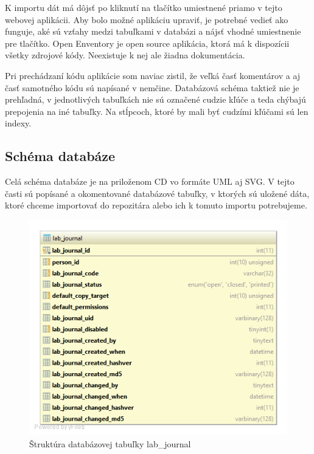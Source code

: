 \documentclass[thesis=M,slovak]{FITthesis}[2013/05/06]
\begin{document}
K importu dát má dôjsť po kliknutí na tlačítko umiestnené priamo v tejto webovej aplikácii. Aby bolo možné aplikáciu upraviť, je potrebné vedieť ako funguje, aké sú vzťahy medzi tabuľkami v databázi a nájsť vhodné umiestnenie pre tlačítko.
Open Enventory je open source aplikácia, ktorá má k dispozícii všetky zdrojové kódy. Neexistuje k nej ale žiadna dokumentácia.

Pri prechádzaní kódu aplikácie som naviac zistil, že veľká časť komentárov a aj časť samotného kódu sú napísané v nemčine. Databázová schéma taktiež nie je prehľadná, v jednotlivých tabuľkách nie sú označené cudzie kľúče a teda chýbajú prepojenia na iné tabuľky. Na stĺpcoch, ktoré by mali byť cudzími kľúčami sú len indexy.

\subsection{Schéma databáze}
Celá schéma databáze je na priloženom CD vo formáte UML aj SVG. V tejto časti sú popísané a okomentované databázové tabuľky, v ktorých sú uložené dáta, ktoré chceme importovať do repozitára alebo ich k tomuto importu potrebujeme.

\begin{figure}\centering
	\includegraphics[width=1.0\textwidth]{Schema_DB_Open_Enventory/lab_journal.png}
 	\caption[Štruktúra databázovej tabuľky lab\_journal]{Štruktúra databázovej tabuľky lab\_journal}\label{graphics:lab_journal}
\end{figure}
\end{document}
